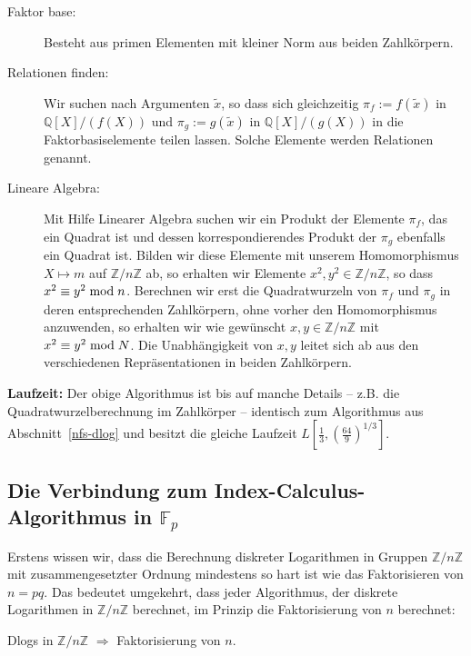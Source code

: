 \begin{refsegment}
\begin{description}
\item[Faktor base:] Besteht aus primen Elementen mit kleiner Norm aus beiden Zahlkörpern.

\item[Relationen finden:] Wir suchen nach Argumenten $\tilde x$, so dass sich gleichzeitig $\pi_f:=f(\tilde x)$ in $\mathbb{Q}[X]/(f(X))$ und $\pi_g:=g(\tilde x)$ in $\mathbb{Q}[X]/(g(X))$ in die Faktorbasiselemente teilen lassen. Solche Elemente werden Relationen genannt.

\item[Lineare Algebra:] Mit Hilfe Linearer Algebra suchen wir ein Produkt der Elemente $\pi_f$, das ein Quadrat ist und dessen korrespondierendes Produkt der $\pi_g$ ebenfalls ein Quadrat ist. Bilden wir diese Elemente mit unserem Homomorphismus $X \mapsto m$ auf $\mathbb{Z}/n\mathbb{Z}$ ab, so erhalten wir Elemente $x^2,y^2 \in \mathbb{Z}/n\mathbb{Z}$, so dass $x^2 \equiv y^2 \hspace{1mm}{\rm mod}\hspace{1mm} n$. Berechnen wir erst die Quadratwurzeln von $\pi_f$ und $\pi_g$ in deren entsprechenden Zahlkörpern, ohne vorher den Homomorphismus anzuwenden, so erhalten wir wie gewünscht $x, y \in \mathbb{Z}/n\mathbb{Z}$ mit $x^2 \equiv y^2 \hspace{1mm}{\rm mod}\hspace{1mm} N$. Die Unabhängigkeit von $x,y$ leitet sich ab aus den verschiedenen Repräsentationen in beiden Zahlkörpern.
\end{description}

\textbf{Laufzeit:}
Der obige Algorithmus ist bis auf manche Details -- z.B. die Quadratwurzelberechnung im Zahlkörper -- identisch zum Algorithmus aus Abschnitt~\ref{nfs-dlog} und besitzt die gleiche Laufzeit $L[\frac 1
3,\left(\frac{64}{9}\right)^{1/3}]$.


\subsection{\texorpdfstring{Die Verbindung zum Index-Calculus-Algorithmus in $\mathbb{F}_p$}{Die Verbindung zum Index-Calculus-Algorithmus in Fp}}

Erstens wissen wir, dass die Berechnung diskreter Logarithmen in Gruppen $\mathbb{Z}/n\mathbb{Z}$ mit zusammengesetzter Ordnung mindestens so hart ist wie das Faktorisieren von $n=pq$. Das bedeutet umgekehrt, dass jeder Algorithmus, der diskrete Logarithmen in $\mathbb{Z}/n\mathbb{Z}$ berechnet, im Prinzip die Faktorisierung von $n$ berechnet:
\begin{center}
  Dlogs in $\mathbb{Z}/n\mathbb{Z}$ $\Rightarrow$ Faktorisierung von $n$.
\end{center}


\end{refsegment}
